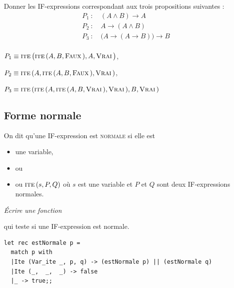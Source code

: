 \begin{Exercise}\it 

Donner les IF-expressions correspondant aux trois propositions suivantes : 
\begin{align*}
  P_1 \ :\ & ( A \land B ) \rightarrow A\\
  P_2 \ :\ & A \rightarrow ( A \land B )\\
  P_3  \ :\ & \bigl(A \rightarrow ( A \rightarrow B )\bigr) \rightarrow B\\
\end{align*}
\end{Exercise}
\begin{Answer} $P_1 \equiv \text{\sc ite}\,\bigl(\text{\sc ite}\, (A,B,\text{\sc Faux}\,),A,\text{\sc Vrai}\,\bigr)$,

$P_2 \equiv \text{\sc ite}\,(A, \text{\sc ite}\,(A, B, \text{\sc Faux}\,), \text{\sc Vrai}\,)$,

$P_3 \equiv \text{\sc ite}\,(\text{\sc ite}\,(A,\text{\sc ite}\,(A, B, \text{\sc Vrai}\,), \text{\sc Vrai}\,), B, \text{\sc Vrai}\,)$
\end{Answer}
\subsection{Forme normale}
On dit qu'une IF-expression est \textsc{normale} si elle est 
\begin{itemize}
\item une variable,
\item \V ou \F
\item ou $\text{\sc ite}\,(s, P, Q)$ où $s$ est une variable 
et $P$ et $Q$ sont deux IF-expressions normales.
\end{itemize}
\begin{Exercise}\it 
Écrire une fonction  

qui teste si une IF-expression est normale.
\end{Exercise}
\begin{Answer} 
\begin{lstlisting}
let rec estNormale p = 
  match p with
  |Ite (Var_ite _, p, q) -> (estNormale p) || (estNormale q)
  |Ite (_,  _,  _) -> false
  |_ -> true;;
\end{lstlisting}
\end{Answer}

